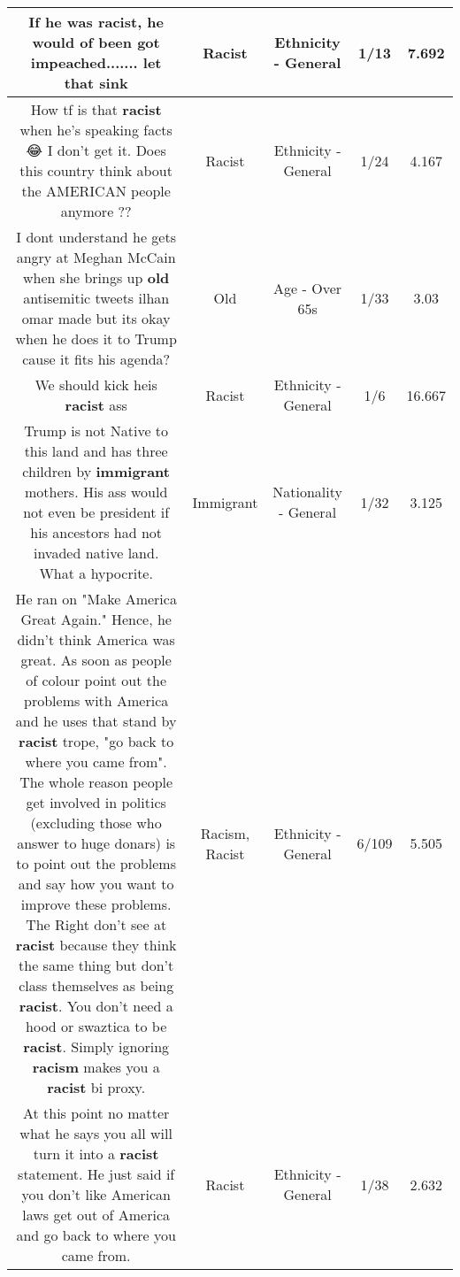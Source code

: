 \documentclass[11pt]{article}
\newlength\mylength
\begin{document}
\begin{center}
\begin{longtable}{|C{.65\mylength}|C{.30\mylength}|C{.12\mylength}|C{.12\mylength}|C{.12\mylength}|}
  \small If he was \textbf{racist}, he would of been got impeached....... let that sink\normalsize   & Racist & Ethnicity - General & 1/13 & 7.692 \\  \hline
  \small How tf is that \textbf{racist} when he's speaking facts 😂 I don't get it. Does this country think about the AMERICAN people anymore ??\normalsize   & Racist & Ethnicity - General & 1/24 & 4.167 \\  \hline
  \small I dont understand he gets angry at Meghan McCain when she brings up \textbf{old} antisemitic tweets ilhan omar made but its okay when he does it to Trump cause it fits his agenda?\normalsize   & Old & Age - Over 65s & 1/33 & 3.03 \\  \hline
  \small We should kick heis \textbf{racist} ass\normalsize   & Racist & Ethnicity - General & 1/6 & 16.667 \\  \hline
  \small Trump is not Native to this land and has three children by \textbf{immigrant} mothers. His ass would not even be president if his ancestors had not invaded native land. What a hypocrite.\normalsize   & Immigrant & Nationality - General & 1/32 & 3.125 \\  \hline
  \small He ran on "Make America Great Again." Hence, he didn't think America was great. As soon as people of colour point out the problems with America and he uses that stand by \textbf{racist} trope, "go back to where you came from". The whole reason people get involved in politics (excluding those who answer to huge donars) is to point out  the problems and say how you want to improve these problems. The Right don't see at \textbf{racist} because they think the same thing but don't class themselves as being \textbf{racist}. You don't need a hood or swaztica to be \textbf{racist}. Simply ignoring \textbf{racism} makes you a \textbf{racist} bi proxy.\normalsize   & Racism, Racist & Ethnicity - General & 6/109 & 5.505 \\  \hline
  \small At this point no matter what he says you all will turn it into a \textbf{racist} statement. He just said if you don't like American laws get out of America and go back to where you came from.\normalsize   & Racist & Ethnicity - General & 1/38 & 2.632 \\  \hline

\end{longtable}
\end{center}
\end{document}

